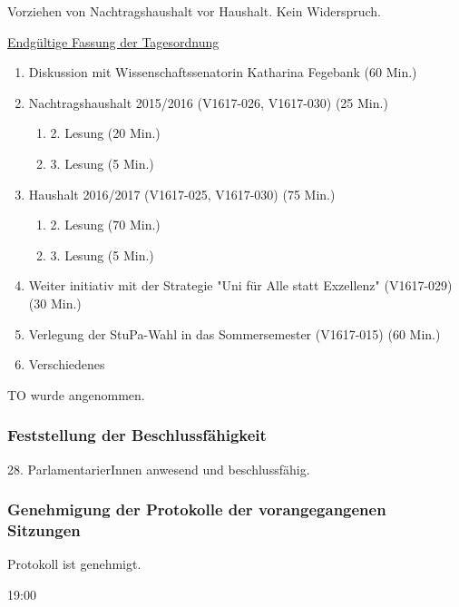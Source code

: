 \documentclass[ngerman,headheight=70pt]{scrartcl}
\begin{document}
    Vorziehen von Nachtragshaushalt vor Haushalt. Kein Widerspruch.

    \underline{Endgültige Fassung der Tagesordnung}
    \begin{enumerate}[label={\textbf{Top \theenumi}},leftmargin=*]
        \item Diskussion mit Wissenschaftssenatorin Katharina Fegebank (60 Min.)
        \item Nachtragshaushalt 2015/2016 (V1617-026, V1617-030) (25 Min.)
        \begin{enumerate}
            \item 2. Lesung (20 Min.)
            \item 3. Lesung (5 Min.)
        \end{enumerate}
        \item Haushalt 2016/2017 (V1617-025, V1617-030) (75 Min.)
        \begin{enumerate}
            \item 2. Lesung (70 Min.)
            \item 3. Lesung (5 Min.)
        \end{enumerate}
        \item Weiter initiativ mit der Strategie "Uni für Alle statt Exzellenz" (V1617-029) (30 Min.)
        \item Verlegung der StuPa-Wahl in das Sommersemester (V1617-015) (60 Min.)
        \item Verschiedenes
    \end{enumerate}

    TO wurde angenommen.

    \subsubsection{Feststellung der Beschlussfähigkeit}

    28. ParlamentarierInnen anwesend und beschlussfähig.

    \subsubsection{Genehmigung der Protokolle der vorangegangenen Sitzungen}

    Protokoll ist genehmigt.

    19:00
\end{document}
